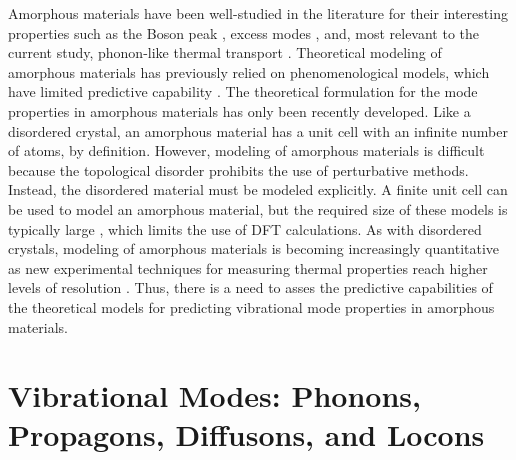 Amorphous materials have been well-studied in the literature for 
their interesting properties such as the Boson peak 
\cite{schirmacher_harmonic_1998,schirmacher_acoustic_2007,
chumakov_equivalence_2011}, 
excess modes \cite{sette_dynamics_1998,zink_excess_2006}, 
and, most relevant to the current study, phonon-like 
thermal transport 
\cite{allen_thermal_1993,feldman_thermal_1993,freeman_thermal_1986,
graebner_phonon_1986,love_estimate_1990,cahill_thermal_1994,
feldman_numerical_1999,baldi_thermal_2008,liu_high_2009,
yang_anomalously_2010,zink_thermal_2006,
hondongwa_ultrasonic_2011,masciovecchio_evidence_2006,
baldi_sound_2010,baldi_elastic_2011,baldi_emergence_2013,
he_heat_2011,pompe_thermal_1988,
hasselman_thermal_1989,kuo_thermal_1992,
wada_thermal_1996,moon_thermal_2002,zink_excess_2006,
zeller_thermal_1971,cahill_lattice_1988,cahill_heat_1989,
lee_heat_1997,yamane_measurement_2002,
regner_broadband_2013}.  
Theoretical modeling of amorphous materials has previously relied 
on phenomenological models, which have limited predictive capability 
\cite{kittel_interpretation_1949,slack_thermal_1979,freeman_thermal_1986,
graebner_phonon_1986,cahill_heat_1989,cahill_lattice_1988}. 
The theoretical formulation 
for the mode properties in amorphous materials has only been 
recently developed.
\cite{allen_thermal_1993,feldman_thermal_1993,allen_diffusons_1999} 
Like a disordered crystal, an amorphous material has a unit cell 
with an infinite number of atoms, by definition. 
However, modeling of amorphous materials is  
difficult because the topological 
disorder prohibits the use of perturbative methods. Instead, the 
disordered material must be modeled explicitly. 
A finite unit cell can be used to model an amorphous material, but 
the required size of these models is typically large 
\cite{feldman_thermal_1993,feldman_numerical_1999}, which 
limits the use of DFT calculations. As with disordered crystals, 
modeling of amorphous materials is becoming increasingly 
quantitative as new experimental techniques for measuring 
thermal properties reach higher levels of resolution 
\cite{masciovecchio_evidence_2006,baldi_thermal_2008,
baldi_sound_2010,baldi_emergence_2013,baldi_elastic_2011,
liu_high_2009,yang_anomalously_2010,
regner_broadband_2013,sultan_heat_2013}. 
Thus, there is a need to asses the predictive capabilities of 
the theoretical models for predicting vibrational mode properties 
in amorphous materials.

\section{\label{ThermalModes}
Vibrational Modes: Phonons, Propagons, Diffusons, and Locons}

